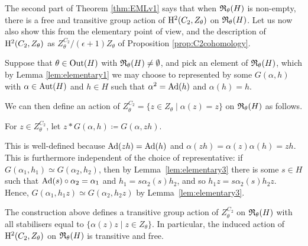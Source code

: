 The second part of Theorem \ref{thm:EMLv1} says that when ${\mathfrak R}_{\theta}(H)$ is non-empty, there is a free and transitive group action of $\mathrm{H}^2(C_2, Z_{\theta})$ on ${\mathfrak R}_{\theta}(H)$. Let us now also show this from the elementary point of view, and the description of $\mathrm{H}^2(C_2, Z_{\theta})$ as $Z^{C_2}_{\theta} / (\epsilon + 1)Z_{\theta}$ of Proposition \ref{prop:C2cohomology}.

Suppose that $\theta \in \operatorname{Out}(H)$ with ${\mathfrak R}_{\theta}(H) \neq \emptyset$, and pick an element of ${\mathfrak R}_{\theta}(H)$, which by Lemma \ref{lem:elementary1} we may choose to represented by some $G(\alpha, h)$ with $\alpha \in \operatorname{Aut} (H)$ and $h \in H$ such that $\alpha^2 = \operatorname{Ad}(h)$ and $\alpha(h) = h$.

We can then define an action of $Z_{\theta}^{C_2} = \{z \in Z_{\theta} \mid \alpha(z) = z\}$ on ${\mathfrak R}_{\theta}(H)$ as follows.

\begin{defn}
  For $z \in Z_{\theta}^{C_2}$, let $z*G(\alpha, h)\coloneqq G(\alpha, zh)$.
\end{defn}

This is well-defined because $\operatorname{Ad}(zh) = \operatorname{Ad}(h)$ and $\alpha(zh) = \alpha(z) \alpha(h) = zh$. This is furthermore independent of the choice of representative: if $G(\alpha_1, h_1) \simeq G(\alpha_2, h_2)$, then by Lemma~\ref{lem:elementary3} there is some $s \in H$ such that $\operatorname{Ad}(s) \circ \alpha_2 = \alpha_1$ and $h_1 = s \alpha_2(s) h_2$, and so $h_1 z = s \alpha_2(s) h_2 z$. Hence, $G(\alpha_1, h_1 z) \simeq G(\alpha_2, h_2 z)$ by Lemma~\ref{lem:elementary3}.

\begin{lemma}\label{lem:freetransaction}
    The construction above defines a transitive group action of $Z_{\theta}^{C_2}$ on ${\mathfrak R}_{\theta}(H)$ with all stabilisers equal to $\{\alpha(z)z \mid z \in Z_{\theta}\}$. In particular, the induced action of $\mathrm{H}^2(C_2, Z_{\theta})$ on ${\mathfrak R}_{\theta}(H)$ is transitive and free.
\end{lemma}

